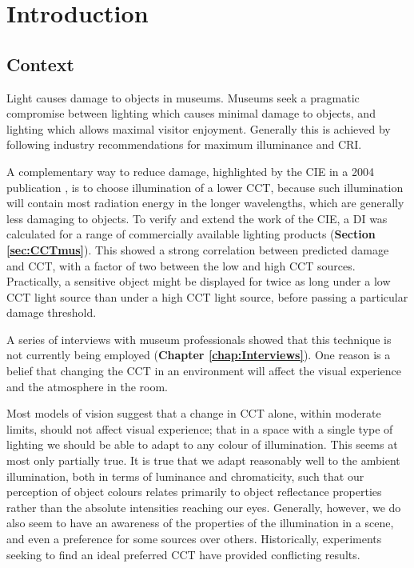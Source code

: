 \chapter{Introduction}
\label{chapterlabel1}

\section{Context}
Light causes damage to objects in museums. Museums seek a pragmatic compromise between lighting which causes minimal damage to objects, and lighting which allows maximal visitor enjoyment. Generally this is achieved by following industry recommendations for maximum illuminance and \gls{CRI}.

A complementary way to reduce damage, highlighted by the \gls{CIE} in a 2004 publication \citep{cie_cie_2004}, is to choose illumination of a lower \gls{CCT}, because such illumination will contain most radiation energy in the longer wavelengths, which are generally less damaging to objects. To verify and extend the work of the \gls{CIE}, a \gls{DI} was calculated for a range of commercially available lighting products (\textbf{Section \ref{sec:CCTmus}}). This showed a strong correlation between predicted damage and \gls{CCT}, with a factor of two between the low and high \gls{CCT} sources. Practically, a sensitive object might be displayed for twice as long under a low \gls{CCT} light source than under a high \gls{CCT} light source, before passing a particular damage threshold. 

A series of interviews with museum professionals showed that this technique is not currently being employed (\textbf{Chapter \ref{chap:Interviews}}). One reason is a belief that changing the \gls{CCT} in an environment will affect the visual experience and the atmosphere in the room.

Most models of vision suggest that a change in \gls{CCT} alone, within moderate limits, should not affect visual experience; that in a space with a single type of lighting we should be able to adapt to any colour of illumination. This seems at most only partially true. It is true that we adapt reasonably well to the ambient illumination, both in terms of luminance and chromaticity, such that our perception of object colours relates primarily to object reflectance properties rather than the absolute intensities reaching our eyes. Generally, however, we do also seem to have an awareness of the properties of the illumination in a scene, and even a preference for some sources over others. Historically, experiments seeking to find an ideal preferred \gls{CCT} have provided conflicting results.

